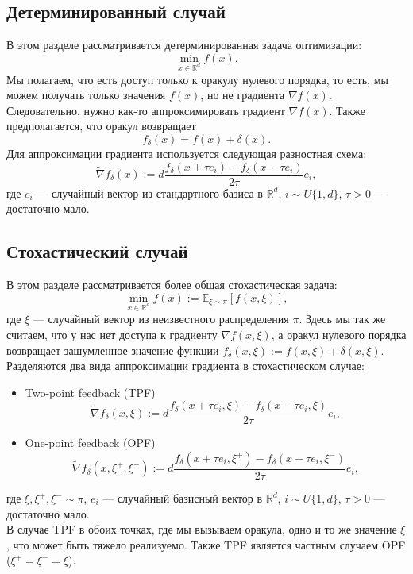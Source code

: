 \documentclass{article}
\begin{document}
\subsection{Детерминированный случай}
В этом разделе рассматривается детерминированная задача оптимизации:
\begin{equation}
 \min\limits_{x \in \mathbb{R}^d} f(x).
 \label{determenistic_problem}
\end{equation}
Мы полагаем, что есть доступ только к оракулу нулевого порядка, то есть, мы можем получать только значения $f(x)$, но не градиента $\nabla f(x)$. Следовательно, нужно как-то аппроксимировать градиент $\nabla f(x)$. Также предполагается, что оракул возвращает
\begin{equation}
 f_\delta (x) = f(x) + \delta (x).
\end{equation}
Для аппроксимации градиента используется следующая разностная схема:
\begin{equation}
\widetilde{\nabla} f_\delta (x) := d\frac{f_\delta (x + \tau e_i) - f_\delta (x - \tau e_i)}{2\tau} e_i,
\label{diff_scheme}
\end{equation}
где $e_i$ --- случайный вектор из стандартного базиса в $\mathbb{R}^d$, $i \sim U\{1, d\}$, $\tau > 0$ --- достаточно мало.

\subsection{Стохастический случай}
В этом разделе рассматривается более общая стохастическая задача:
\begin{equation}
 \min\limits_{x \in \mathbb{R}^d} f(x) := \mathbb{E}_{\xi \sim \pi}[f(x, \xi)], \label{stochastic_problem}
\end{equation}
где $\xi$ --- случайный вектор из неизвестного распределения $\pi$. Здесь мы так же считаем, что у нас нет доступа к градиенту $\nabla f(x, \xi)$, а оракул нулевого порядка возвращает зашумленное значение функции $f_\delta (x, \xi) := f(x, \xi) + \delta (x, \xi)$.\\
Разделяются два вида аппроксимации градиента в стохастическом случае:
\begin{itemize}
 \item Two-point feedback (TPF)
 \begin{equation}
  \widetilde{\nabla} f_\delta (x, \xi) := d\frac{f_\delta (x + \tau e_i, \xi) - f_\delta (x - \tau e_i, \xi)}{2\tau} e_i,\label{TPF}
 \end{equation}
 \item One-point feedback (OPF)
 \begin{equation}
  \widetilde{\nabla} f_\delta (x, \xi^+, \xi^-) := d\frac{f_\delta (x + \tau e_i, \xi^+) - f_\delta (x - \tau e_i, \xi^-)}{2\tau} e_i,\label{OPF}
 \end{equation}
\end{itemize}
где $\xi, \xi^+, \xi^- \sim \pi$, $e_i$ --- случайный базисный вектор в $\mathbb{R}^d$, $i \sim U\{1, d\}$, $\tau > 0$ --- достаточно мало.\\
В случае TPF в обоих точках, где мы вызываем оракула, одно и то же значение $\xi$, что может быть тяжело реализуемо. Также TPF является частным случаем OPF ($\xi^+ = \xi^- = \xi$).
\end{document}
